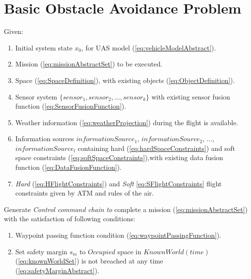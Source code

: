 \newpage
\section{Basic Obstacle Avoidance Problem}\label{s:BasicProblemDefinition}
    \noindent Given:

    \begin{enumerate}
        \item Initial system state $x_0$, for UAS model (\ref{eq:vehicleModelAbstract}).
        
        \item Mission (\ref{eq:missionAbstractSet}) to be executed.
        
        \item Space (\ref{eq:SpaceDefinition}), with existing objects (\ref{eq:ObjectDefinition}).
        
        \item Sensor system $\{sensor_1, sensor_2,\dots,sensor_k\}$ with existing sensor fusion function (\ref{eq:SensorFusionFunction}).
        
        \item Weather information (\ref{eq:weatherProjection}) during the flight is available.
        
        \item Information sources $informationSource_1$, $informationSource_2$, $\dots$, $informationSource_l$ containing hard (\ref{eq:hardSpaceConstraints}) and soft space constraints (\ref{eq:softSpaceConstraints}),with existing data fusion function (\ref{eq:DataFusionFunction}).
        
        \item \emph{Hard} (\ref{eq:HFlightConstraints}) and \emph{Soft} \ref{eq:SFlightConstraints} flight constraints given by ATM and rules of the air. 
    \end{enumerate}

    \noindent Generate \emph{Control command chain to} complete a mission (\ref{eq:missionAbstractSet}) with the satisfaction of following conditions:
    
    \begin{enumerate}
        \item Waypoint passing function condition (\ref{eq:waypointPassingFunction}).
        
        \item Set safety margin $s_m$ to $Occupied$  space in $KnownWorld(time)$ (\ref{eq:knownWorldSet}) is not breached at any time (\ref{eq:safetyMarginAbstract}).
    \end{enumerate}
